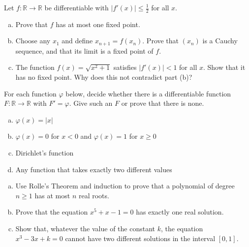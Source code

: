 \begin{problem}[Homing in]
Let $f : \mathbb{R} \to \mathbb{R}$ be differentiable with $|f'(x)| \leq \frac12$ for all $x$.
\begin{enumerate}[(a)]
	\item Prove that $f$ has at most one fixed point.
	\item Choose any $x_1$ and define $x_{n+1} = f(x_n)$.  Prove that $(x_n)$ is a Cauchy sequence, and that its limit is a fixed point of $f$.
	\item The function $f(x) = \sqrt{x^2 + 1}$ satisfies $|f'(x)| < 1$ for all $x$.  Show that it has no fixed point.  Why does this not contradict part (b)?
\end{enumerate}
\end{problem}

\begin{problem}
For each function $\varphi$ below, decide whether there is a differentiable function $F : \mathbb{R} \to \mathbb{R}$ with $F' = \varphi$.  Give such an $F$ or prove that there is none.
\begin{enumerate}[(a)]
	\item $\varphi(x) = |x|$
	\item $\varphi(x) = 0$ for $x < 0$ and $\varphi(x) = 1$ for $x \geq 0$
	\item Dirichlet's function
	\item Any function that takes exactly two different values
\end{enumerate}
\end{problem}

\begin{problem}
\begin{enumerate}[(a)]
	\item Use Rolle's Theorem and induction to prove that a polynomial of degree $n \geq 1$ has at most $n$ real roots.
	\item Prove that the equation $x^5 + x - 1 = 0$ has exactly one real solution.
	\item Show that, whatever the value of the constant $k$, the equation $x^3 - 3x + k = 0$ cannot have two different solutions in the interval $[0,1]$.
\end{enumerate}
\end{problem}


